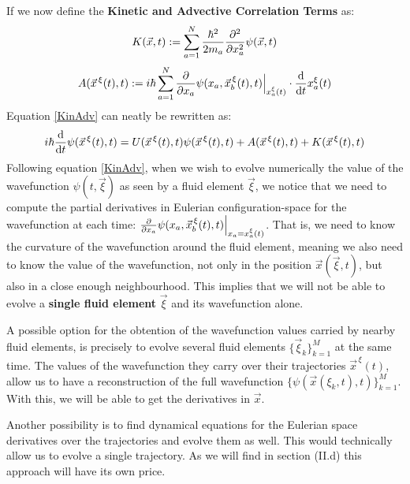 \documentclass[11pt, a4paper]{article} %
\begin{document}
If we now define the {\bf Kinetic and Advective Correlation Terms} as:\vspace{-0.1cm}
\begin{equation}\label{Kin}
K(\vec{x},t):=\sum_{a=1}^N \frac{\hbar^2}{2m_a}\pdv[2]{}{x_a}\psi(\vec{x},t)
\end{equation}\vspace{-0.1cm}
\begin{equation}\label{Adv}
A(\vec{x}^{\, \xi}(t),t):=i\hbar \sum_{a=1}^N \pdv{}{x_a}\psi(x_a,\vec{x}_b^{\, \xi}(t), t)\Big\rvert_{x^\xi_a(t)}\cdot \dv{}{t}x^\xi_a(t)
\end{equation}
Equation \eqref{KinAdv} can neatly be rewritten as:\vspace{-0.1cm}
\begin{equation}
i\hbar \dv{}{t}\psi(\vec{x}^{\, \xi}(t),t)=U(\vec{x}^{\, \xi}(t),t)\psi(\vec{x}^{\, \xi}(t),t)+A(\vec{x}^{\, \xi}(t),t)+K(\vec{x}^{\, \xi}(t),t)\vspace{-0.1cm}
\end{equation}
Following equation \eqref{KinAdv}, when we wish to evolve numerically the value of the wavefunction  $\psi(t,\vec{\xi})$ as seen by a fluid element $\vec{\xi}$, we notice that we need to compute the partial derivatives in Eulerian configuration-space for the wavefunction at each time: $\pdv{}{x_a}\psi(x_a,\vec{x}_b^{\, \xi}(t), t)\Big\rvert_{x_a=x^\xi_a(t)}$. That is, we need to know the curvature of the wavefunction around the fluid element, meaning we also need to know the value of the wavefunction, not only in the position $\vec{x}(\vec{\xi},t)$, but also in a close enough neighbourhood. This implies that we will not be able to evolve a {\bf single fluid element} $\vec{\xi}$ and its wavefunction alone. 

A possible option for the obtention of the wavefunction values carried by nearby fluid elements, is precisely to evolve several fluid elements $\{\vec{\xi}_k\}_{k=1}^M$ at the same time. The values of the wavefunction they carry over their trajectories $\vec{x}^{\, \xi}(t)$, allow us to have a reconstruction of the full wavefunction $\{\psi(\vec{x}(\xi_k,t),t) \}_{k=1}^M$. With this, we will be able to get the derivatives in $\vec{x}$.\vspace{-0.1cm}

Another possibility is to find dynamical equations for the Eulerian space derivatives over the trajectories and evolve them as well. This would technically allow us to evolve a single trajectory. As we will find in section (II.d) this approach will have its own price.\vspace{-0.1cm}
\end{document}
